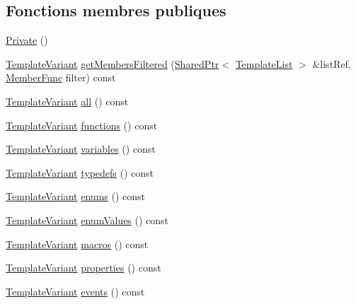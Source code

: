 \subsection*{Fonctions membres publiques}
\begin{DoxyCompactItemize}
\item 
\hyperlink{class_globals_index_context_1_1_private_ab0330573fa6ee6f909d527849cc7d454}{Private} ()
\item 
\hyperlink{class_template_variant}{Template\+Variant} \hyperlink{class_globals_index_context_1_1_private_a15b26c5a25d74b5993e56a5068b8e008}{get\+Members\+Filtered} (\hyperlink{class_shared_ptr}{Shared\+Ptr}$<$ \hyperlink{class_template_list}{Template\+List} $>$ \&list\+Ref, \hyperlink{class_globals_index_context_1_1_private_a8d7afa38481f112522b6a0df12c98592}{Member\+Func} filter) const 
\item 
\hyperlink{class_template_variant}{Template\+Variant} \hyperlink{class_globals_index_context_1_1_private_abfd62b7d1a371b6cd0775e7bc9b95f61}{all} () const 
\item 
\hyperlink{class_template_variant}{Template\+Variant} \hyperlink{class_globals_index_context_1_1_private_a8ce268e8ff50281e7140cccfaa4de253}{functions} () const 
\item 
\hyperlink{class_template_variant}{Template\+Variant} \hyperlink{class_globals_index_context_1_1_private_ad520ec8728a81f6985ee2404ce28f3a1}{variables} () const 
\item 
\hyperlink{class_template_variant}{Template\+Variant} \hyperlink{class_globals_index_context_1_1_private_ab75da93aeeb87b743327f75f8c078b07}{typedefs} () const 
\item 
\hyperlink{class_template_variant}{Template\+Variant} \hyperlink{class_globals_index_context_1_1_private_a9774b898ec7bb8dab9027e5b38437594}{enums} () const 
\item 
\hyperlink{class_template_variant}{Template\+Variant} \hyperlink{class_globals_index_context_1_1_private_a4970aa721eafeeba90956fd0d4cd7e07}{enum\+Values} () const 
\item 
\hyperlink{class_template_variant}{Template\+Variant} \hyperlink{class_globals_index_context_1_1_private_ac247361b1144164c51b017951f5eb8d7}{macros} () const 
\item 
\hyperlink{class_template_variant}{Template\+Variant} \hyperlink{class_globals_index_context_1_1_private_a3ca1024f3899167b5be4ab46375f1d6f}{properties} () const 
\item 
\hyperlink{class_template_variant}{Template\+Variant} \hyperlink{class_globals_index_context_1_1_private_aa7515e00e8f7137638199f49cdd1f128}{events} () const 

\end{DoxyCompactItemize}
